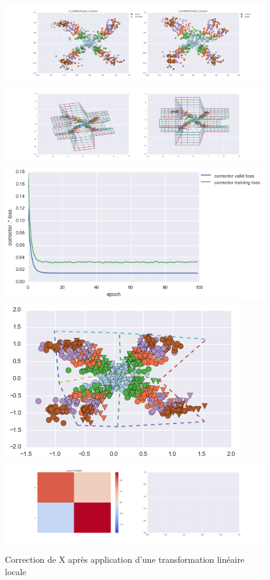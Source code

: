 \begin{figure}[H] %
\centering
\includegraphics[width=\linewidth]{fig/24-05-2016/X/X_GridBendCluster_Corrector-DATA.png}
\includegraphics[width=\linewidth]{fig/24-05-2016/X/X_GridBendCluster_Corrector-GridCheck.png}
\includegraphics[width=0.45\linewidth]{fig/24-05-2016/X/X_GridBendCluster_Corrector-Learning_curve.png}
\includegraphics[width=0.45\linewidth]{fig/24-05-2016/X/X_grid.png}
\includegraphics[width=\linewidth]{fig/24-05-2016/X/X_GridBendCluster_Corrector-W.png}
\caption{Correction de X après application d'une transformation linéaire locale}
\label{fig:recap-X-GridBend-cluster}
\end{figure}

